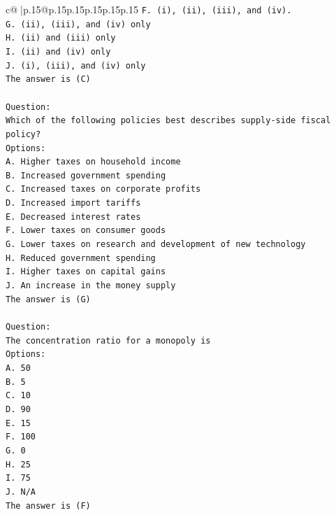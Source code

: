 \documentclass{article}
\begin{document}
{\begin{supertabular}{c@{$\;$}|p{.15\linewidth}@{}p{.15\linewidth}p{.15\linewidth}p{.15\linewidth}p{.15\linewidth}p{.15\linewidth}}
{{{\texttt{F. (i), (ii), (iii), and (iv).} \\
\texttt{G. (ii), (iii), and (iv) only} \\
\texttt{H. (ii) and (iii) only} \\
\texttt{I. (ii) and (iv) only} \\
\texttt{J. (i), (iii), and (iv) only} \\
\texttt{The answer is (C)} \\
\\ 
\texttt{Question:} \\
\texttt{Which of the following policies best describes supply{-}side fiscal policy?} \\
\texttt{Options:} \\
\texttt{A. Higher taxes on household income} \\
\texttt{B. Increased government spending} \\
\texttt{C. Increased taxes on corporate profits} \\
\texttt{D. Increased import tariffs} \\
\texttt{E. Decreased interest rates} \\
\texttt{F. Lower taxes on consumer goods} \\
\texttt{G. Lower taxes on research and development of new technology} \\
\texttt{H. Reduced government spending} \\
\texttt{I. Higher taxes on capital gains} \\
\texttt{J. An increase in the money supply} \\
\texttt{The answer is (G)} \\
\\ 
\texttt{Question:} \\
\texttt{The concentration ratio for a monopoly is} \\
\texttt{Options:} \\
\texttt{A. 50} \\
\texttt{B. 5} \\
\texttt{C. 10} \\
\texttt{D. 90} \\
\texttt{E. 15} \\
\texttt{F. 100} \\
\texttt{G. 0} \\
\texttt{H. 25} \\
\texttt{I. 75} \\
\texttt{J. N/A} \\
\texttt{The answer is (F)} \\
}}}
\end{supertabular}}
\end{document}
